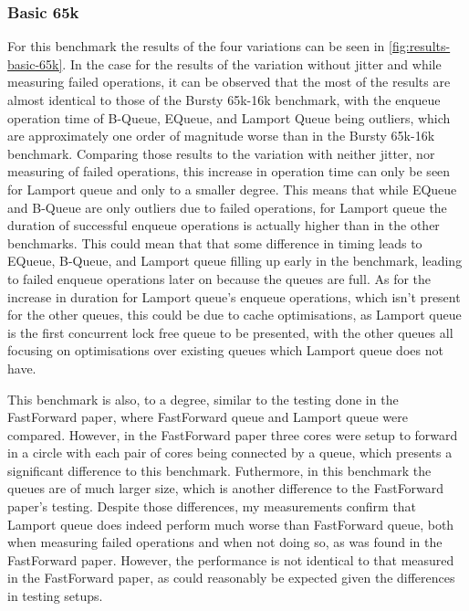 \subsubsection{Basic 65k}
For this benchmark the results of the four variations can be seen in \autoref{fig:results-basic-65k}.
In the case for the results of the variation without jitter and while measuring failed operations,
it can be observed that the most of the results are almost identical to those of the Bursty 65k-16k benchmark,
with the enqueue operation time of B-Queue, EQueue, and Lamport Queue being outliers,
which are approximately one order of magnitude worse than in the Bursty 65k-16k benchmark.
Comparing those results to the variation with neither jitter, nor measuring of failed operations,
this increase in operation time can only be seen for Lamport queue and only to a smaller degree.
This means that while EQueue and B-Queue are only outliers due to failed operations,
for Lamport queue the duration of successful enqueue operations is actually higher than in the other benchmarks.
This could mean that that some difference in timing leads to EQueue, B-Queue, and Lamport queue filling up
early in the benchmark, leading to failed enqueue operations later on because the queues are full.
As for the increase in duration for Lamport queue's enqueue operations, which isn't present for the other queues,
this could be due to cache optimisations, as Lamport queue is the first concurrent lock free queue to be presented,
with the other queues all focusing on optimisations over existing queues which Lamport queue does not
have\cite{Lamport}.

This benchmark is also, to a degree, similar to the testing done in the FastForward paper, where FastForward
queue and Lamport queue were compared.
However, in the FastForward paper three cores were setup to forward in a circle with each pair of cores being
connected by a queue, which presents a significant difference to this benchmark\cite{FastForward}.
Futhermore, in this benchmark the queues are of much larger size, which is another difference to the
FastForward paper's testing.
Despite those differences, my measurements confirm that Lamport queue does indeed perform much worse than
FastForward queue, both when measuring failed operations and when not doing so, as was found in the FastForward paper.
However, the performance is not identical to that measured in the FastForward paper, as could reasonably be
expected given the differences in testing setups.

